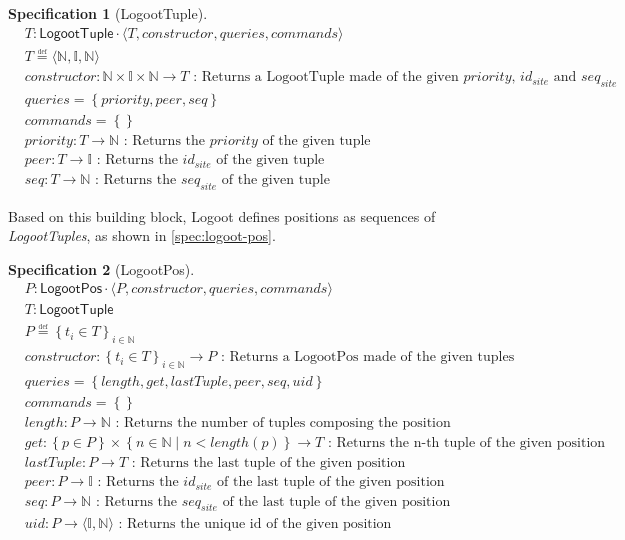 \documentclass{article}
\newcommand{\commands}[1]{commands = \set{#1}}
\newcommand{\defeq}{\overset{\underset{\mathrm{def}}{}}{=}}
\newcommand{\fnspec}[3]{#1: #2 \text{ : #3}}
\newcommand{\inbb}[1]{\in \mathbb{#1}}
\newcommand{\mathlist}[2]{\set{#1_i \in #2}_{i \inbb{N}}}
\newcommand{\queries}[1]{queries = \set{#1}}
\newcommand{\set}[1]{\left\{#1\right\}} %
\newcommand{\spectuple}[1]{\tuple{#1, constructor, queries, commands}}
\newcommand{\ssep}{\mid} %
\newcommand{\tuple}[1]{\langle #1 \rangle}
\theoremstyle{definition}
\newtheorem{specification}{Specification}
\begin{document}
\begin{specification}[LogootTuple]
    \begin{align*}
    &T: \mathsf{LogootTuple} \cdot \spectuple{T}\\
    &T \defeq \tuple{\mathbb{N}, \mathbb{I}, \mathbb{N}}\\
    &\fnspec{constructor}{\mathbb{N} \times \mathbb{I} \times \mathbb{N} \to T}{Returns a LogootTuple made of the given $priority$, $id_{site}$ and $seq_{site}$}\\
    &\queries{priority, peer, seq}\\
    &\commands{}\\
    &\fnspec{priority}{T \to \mathbb{N}}{Returns the $priority$ of the given tuple}\\
    &\fnspec{peer}{T \to \mathbb{I}}{Returns the $id_{site}$ of the given tuple}\\
    &\fnspec{seq}{T \to \mathbb{N}}{Returns the $seq_{site}$ of the given tuple}
    \end{align*}
    \label{spec:logoot-tuple}
\end{specification}

Based on this building block, Logoot defines positions as sequences of \emph{LogootTuples}, as shown in \autoref{spec:logoot-pos}.

\begin{specification}[LogootPos]
    \begin{align*}
    &P: \mathsf{LogootPos} \cdot \spectuple{P}\\
    &T: \mathsf{LogootTuple}\\
    &P \defeq \mathlist{t}{T}\\
    &\fnspec{constructor}{\mathlist{t}{T} \to P}{Returns a LogootPos made of the given tuples}\\
    &\queries{length, get, lastTuple, peer, seq, uid}\\
    &\commands{}\\
    &\fnspec{length}{P \to \mathbb{N}}{Returns the number of tuples composing the position}\\
    &\fnspec{get}{\set{p \in P} \times \set{n \inbb{N} \ssep n < length(p)} \to T}{Returns the n-th tuple of the given position}\\
    &\fnspec{lastTuple}{P \to T}{Returns the last tuple of the given position}\\
    &\fnspec{peer}{P \to \mathbb{I}}{Returns the $id_{site}$ of the last tuple of the given position}\\
    &\fnspec{seq}{P \to \mathbb{N}}{Returns the $seq_{site}$ of the last tuple of the given position}\\
    &\fnspec{uid}{P \to \tuple{\mathbb{I}, \mathbb{N}}}{Returns the unique id of the given position}
    \end{align*}
    \label{spec:logoot-pos}
\end{specification}
\end{document}
